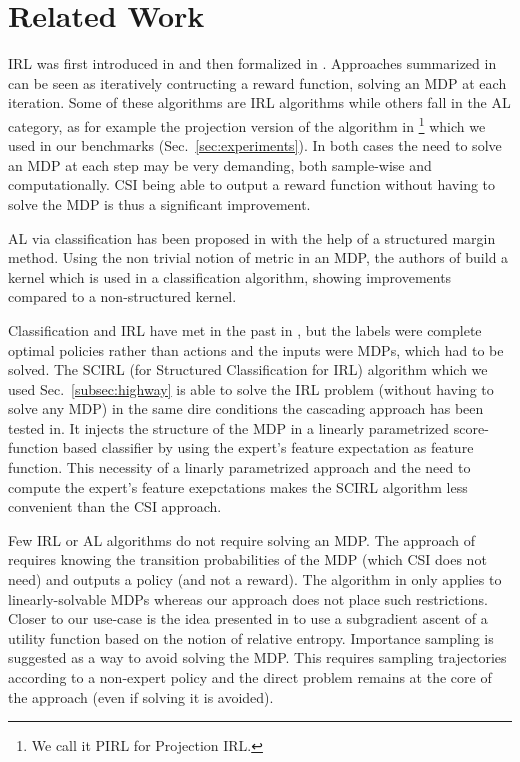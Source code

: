 \documentclass[smallextended]{svjour3}
\begin{document}
\section{Related Work}
\label{sec:related}
IRL was first introduced in \cite{russell1998learning} and then formalized in \cite{ng2000algorithms}. Approaches summarized in \cite{neu2009training} can be seen as iteratively contructing a reward function, solving an MDP at each iteration. Some of these algorithms are IRL algorithms while others fall in the AL category, as for example the projection version of the algorithm in \cite{abbeel2004apprenticeship}\footnote{We call it PIRL for Projection IRL.} which we used in our benchmarks (Sec.~\ref{sec:experiments}). In both cases the need to solve an MDP at each step may be very demanding, both sample-wise and computationally. CSI being able to output a reward function without having to solve the MDP is thus a significant improvement.

AL via classification has been proposed in \cite{ratliff2007imitation} with the help of a structured margin method. Using the non trivial notion of metric in an MDP, the authors of \cite{melo2010learning} build a kernel which is used
in a classification algorithm, showing improvements compared to a
non-structured kernel.

Classification and IRL have met in the past in \cite{ratliff2006maximum}, but the labels were complete optimal policies rather than actions and the inputs were MDPs, which had to be solved. The SCIRL (for Structured Classification for IRL) algorithm \cite{klein2012scirl} which we used Sec.~\ref{subsec:highway} is able to solve the IRL problem (without having to solve any MDP) in the same dire conditions the cascading approach has been tested in. It injects the structure of the MDP in a linearly parametrized score-function based classifier by using the expert's feature expectation as feature function. This necessity of a linarly parametrized approach and the need to compute the expert's feature exepctations makes the SCIRL algorithm less convenient than the CSI approach.

Few IRL or AL algorithms do not require solving an MDP. The approach of \cite{syed2008apprenticeship} requires knowing the transition probabilities of the MDP (which CSI does not need) and outputs a policy (and not a reward). The algorithm in \cite{dvijotham2010inverse} only applies to linearly-solvable MDPs whereas our approach does not place such restrictions. Closer to our use-case is the idea presented in \cite{boularias2011relative} to use a subgradient ascent of a utility function based on the notion of relative entropy. Importance sampling is suggested as a way to avoid solving the MDP. This requires sampling trajectories according to a non-expert policy and
the direct problem remains at the core of the approach (even if
solving it is avoided).
\end{document}
